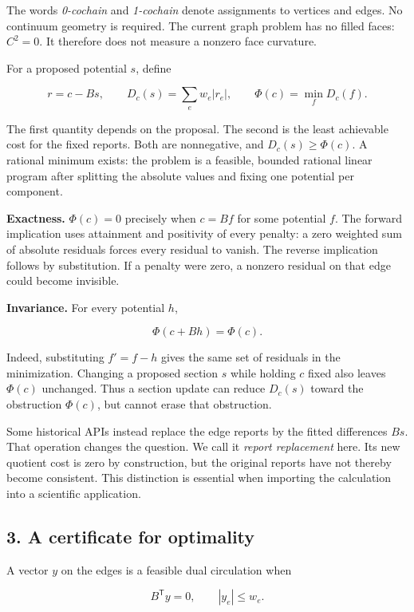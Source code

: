 \documentclass[
  11pt,
]{article}
\begin{document}
The words \emph{0-cochain} and \emph{1-cochain} denote assignments to
vertices and edges. No continuum geometry is required. The current graph
problem has no filled faces: \(C^2=0\). It therefore does not measure a
nonzero face curvature.

For a proposed potential \(s\), define

\[
r=c-Bs,\qquad D_c(s)=\sum_e w_e|r_e|,
\qquad \Phi(c)=\min_f D_c(f).
\]

The first quantity depends on the proposal. The second is the least
achievable cost for the fixed reports. Both are nonnegative, and
\(D_c(s)\geq\Phi(c)\). A rational minimum exists: the problem is a
feasible, bounded rational linear program after splitting the absolute
values and fixing one potential per component.

\textbf{Exactness.} \(\Phi(c)=0\) precisely when \(c=Bf\) for some
potential \(f\). The forward implication uses attainment and positivity
of every penalty: a zero weighted sum of absolute residuals forces every
residual to vanish. The reverse implication follows by substitution. If
a penalty were zero, a nonzero residual on that edge could become
invisible.

\textbf{Invariance.} For every potential \(h\),

\[
\Phi(c+Bh)=\Phi(c).
\]

Indeed, substituting \(f'=f-h\) gives the same set of residuals in the
minimization. Changing a proposed section \(s\) while holding \(c\)
fixed also leaves \(\Phi(c)\) unchanged. Thus a section update can
reduce \(D_c(s)\) toward the obstruction \(\Phi(c)\), but cannot erase
that obstruction.

Some historical APIs instead replace the edge reports by the fitted
differences \(Bs\). That operation changes the question. We call it
\emph{report replacement} here. Its new quotient cost is zero by
construction, but the original reports have not thereby become
consistent. This distinction is essential when importing the calculation
into a scientific application.

\subsection{3. A certificate for
optimality}\label{a-certificate-for-optimality}

A vector \(y\) on the edges is a feasible dual circulation when

\[
B^\mathsf{T}y=0,\qquad |y_e|\leq w_e.
\]
\end{document}
